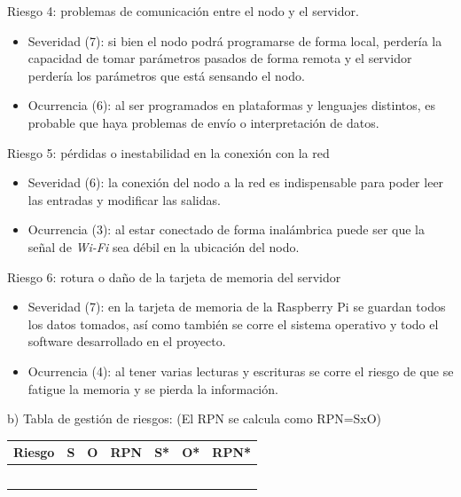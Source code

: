 \documentclass[
11pt, %
]{charter}
\begin{document}
Riesgo 4: problemas de comunicación entre el nodo y el servidor.
\begin{itemize}
	\item Severidad (7): si bien el nodo podrá programarse de forma local, perdería la capacidad de tomar parámetros pasados de forma remota y el servidor perdería los parámetros que está sensando el nodo.
	\item Ocurrencia (6): al ser programados en plataformas y lenguajes distintos, es probable que haya problemas de envío o interpretación de datos.
\end{itemize}

Riesgo 5: pérdidas o inestabilidad en la conexión con la red
\begin{itemize}
	\item Severidad (6): la conexión del nodo a la red es indispensable para poder leer las entradas y modificar las salidas.
	\item Ocurrencia (3): al estar conectado de forma inalámbrica puede ser que la señal de \textit{Wi-Fi} sea débil en la ubicación del nodo.
\end{itemize}

Riesgo 6: rotura o daño de la tarjeta de memoria del servidor
\begin{itemize}
	\item Severidad (7): en la tarjeta de memoria de la Raspberry Pi se guardan todos los datos tomados, así como también se corre el sistema operativo y todo el software desarrollado en el proyecto.
	\item Ocurrencia (4): al tener varias lecturas y escrituras se corre el riesgo de que se fatigue la memoria y se pierda la información.
\end{itemize}

b) Tabla de gestión de riesgos:      (El RPN se calcula como RPN=SxO)

\begin{table}[htpb]
\centering
\begin{tabularx}{\linewidth}{@{}|X|c|c|c|c|c|c|@{}}
\hline
\rowcolor[HTML]{C0C0C0} 
Riesgo & S & O & RPN & S* & O* & RPN* \\ \hline
       &   &   &     &    &    &      \\ \hline
       &   &   &     &    &    &      \\ \hline
       &   &   &     &    &    &      \\ \hline
       &   &   &     &    &    &      \\ \hline
       &   &   &     &    &    &      \\ \hline
\end{tabularx}%
\end{table}
\end{document}
